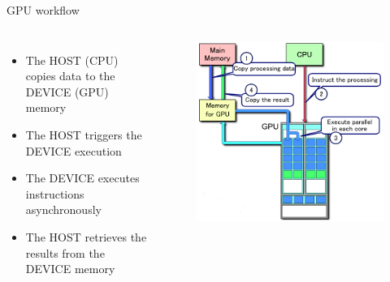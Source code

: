 \documentclass[10pt,times]{beamer}
\begin{document}
\begin{frame}{GPU workflow}
\begin{columns}

\begin{itemize}
\item The HOST (CPU) copies data to the DEVICE (GPU) memory
\item The HOST triggers the DEVICE execution
\item The DEVICE executes instructions asynchronously
\item The HOST retrieves the results from the DEVICE memory
\end{itemize}
\begin{figure}
\includegraphics[width=\linewidth]{figs/GPU_Workflow.png}
\end{figure}
\end{columns}
\end{frame}
\end{document}
